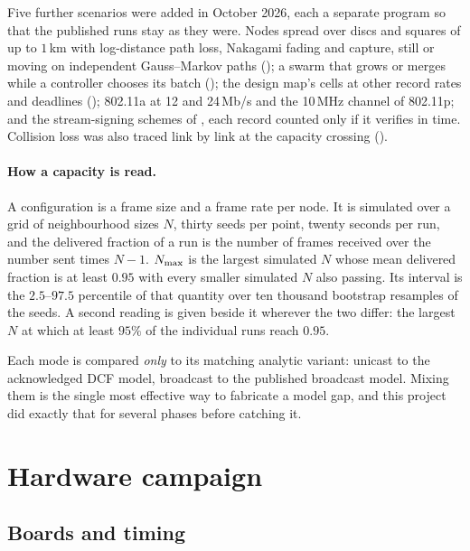 Five further scenarios were added in October 2026, each a separate program so that the
published runs stay as they were. Nodes spread over discs and squares of up to $1$\,km with
log-distance path loss, Nakagami fading and capture, still or moving on independent
Gauss--Markov paths (); a swarm that grows or merges while a controller
chooses its batch (); the design map's cells at other record rates and
deadlines (); 802.11a at 12 and 24\,Mb/s and the 10\,MHz channel of
802.11p; and the stream-signing schemes of , each record counted only if it
verifies in time. Collision loss was also traced link by link at the capacity crossing
().

\paragraph{How a capacity is read.} A configuration is a frame size and a frame rate per node.
It is simulated over a grid of neighbourhood sizes $N$, thirty seeds per point, twenty seconds
per run, and the delivered fraction of a run is the number of frames received over the number
sent times $N-1$. $N_{\max}$ is the largest simulated $N$ whose mean delivered fraction is at
least $0.95$ with every smaller simulated $N$ also passing. Its interval is the $2.5$--$97.5$
percentile of that quantity over ten thousand bootstrap resamples of the seeds. A second reading
is given beside it wherever the two differ: the largest $N$ at which at least $95\%$ of the
individual runs reach $0.95$.

\begin{remark}
Each mode is compared \emph{only} to its matching analytic variant: unicast to the acknowledged DCF
model, broadcast to the published broadcast model. Mixing them is the single most effective way to
fabricate a model gap, and this project did exactly that for several phases before catching it.
\end{remark}

\section{Hardware campaign}\label{sec:hardware-method}

\subsection{Boards and timing}

